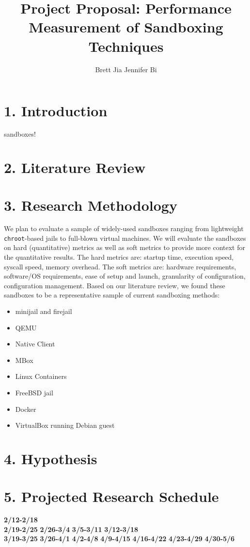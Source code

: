 \documentclass{proc}
\begin{document}
\title{Project Proposal: Performance Measurement of Sandboxing Techniques}

\author{Brett Jia \hspace{1em} Jennifer Bi}

\maketitle

\section*{1. Introduction}

sandboxes!

\section*{2. Literature Review}

\section*{3. Research Methodology}
We plan to evaluate a sample of widely-used sandboxes ranging from lightweight \texttt{chroot}-based jails to full-blown virtual machines. We will evaluate the sandboxes on hard (quantitative) metrics as well as soft metrics to provide more context for the quantitative results. The hard metrics are: startup time, execution speed, syscall speed, memory overhead. The soft metrics are: hardware requirements, software/OS requirements, ease of setup and launch, granularity of configuration, configuration management.
Based on our literature review, we found these sandboxes to be a representative sample of current sandboxing methods:\vspace{0.5em}
{\small
\begin{itemize}
\item minijail and firejail
\item QEMU
\item Native Client
\item MBox
\item Linux Containers
\item FreeBSD jail
\item Docker
\item VirtualBox running Debian guest
\end{itemize}
}

\section*{4. Hypothesis}

\section*{5. Projected Research Schedule}
\textbf{2/12-2/18} \\
\textbf{2/19-2/25}
\textbf{2/26-3/4}
\textbf{3/5-3/11}
\textbf{3/12-3/18} \\
\textbf{3/19-3/25}
\textbf{3/26-4/1}
\textbf{4/2-4/8}
\textbf{4/9-4/15}
\textbf{4/16-4/22}
\textbf{4/23-4/29}
\textbf{4/30-5/6}  






\end{document}
